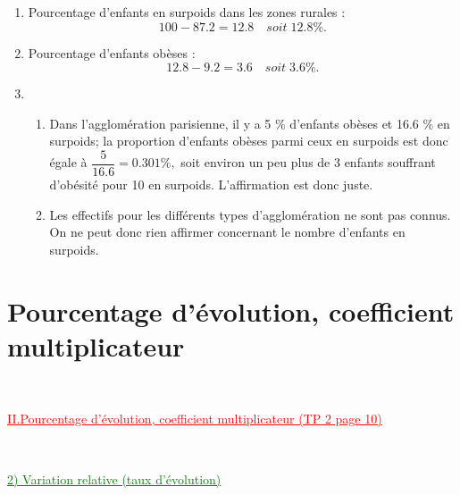\documentclass[xcolor={dvipsnames}]{beamer}
\begin{document}
\begin{frame}{}
\begin{enumerate}
	\item  Pourcentage d'enfants en surpoids dans les zones rurales :\pause
	\begin{equation*}
	\num{100} - \num{87.2} = \num{12.8} \quad soit \; \num{12.8} \%.
	\end{equation*}\pause
	
	 
	
	\item  Pourcentage d'enfants obèses :\pause
	\begin{equation*}
	\num{12.8} - \num{9.2} = \num{3.6} \quad soit \; \num{3.6} \%.
	\end{equation*}\pause
	
	\item \begin{enumerate}[a]
		\item Dans l'agglomération parisienne, il y a \num{5} \% d'enfants obèses et \num{16.6} \% en surpoids; la proportion d'enfants obèses parmi ceux en surpoids est donc égale à $\dfrac{5}{\num{16.6}}=\num{0.301} \%,$ soit environ un peu plus de 3 enfants souffrant d'obésité pour 10 en surpoids. L'affirmation est donc juste.\pause
		
		\item Les effectifs pour les différents types d'agglomération ne sont pas connus. On ne peut donc rien affirmer concernant le nombre d'enfants en surpoids.
	\end{enumerate}
	
	
\end{enumerate}
\end{frame}

\section{Pourcentage d'évolution, coefficient multiplicateur}

\begin{frame}
\

\begin{Large}
	\textcolor{Red}{\underline{II.Pourcentage d'évolution, coefficient multiplicateur (TP 2 page 10)}}
\end{Large}\pause
\

\vspace*{1cm}

\textcolor{Green}{\underline{2) Variation relative (taux d'évolution)}}
\end{frame}
\end{document}
